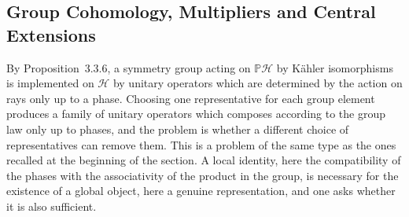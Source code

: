 
%
%

\subsection{Group Cohomology, Multipliers and Central Extensions}\label{subsec:group-cohomology}

By Proposition~3.3.6, a symmetry group acting on $\mathbb{P}\mathcal{H}$ by Kähler isomorphisms is implemented on $\mathcal{H}$ by unitary operators which are determined by the action on rays only up to a phase. Choosing one representative for each group element produces a family of unitary operators which composes according to the group law only up to phases, and the problem is whether a different choice of representatives can remove them. This is a problem of the same type as the ones recalled at the beginning of the section. A local identity, here the compatibility of the phases with the associativity of the product in the group, is necessary for the existence of a global object, here a genuine representation, and one asks whether it is also sufficient.

